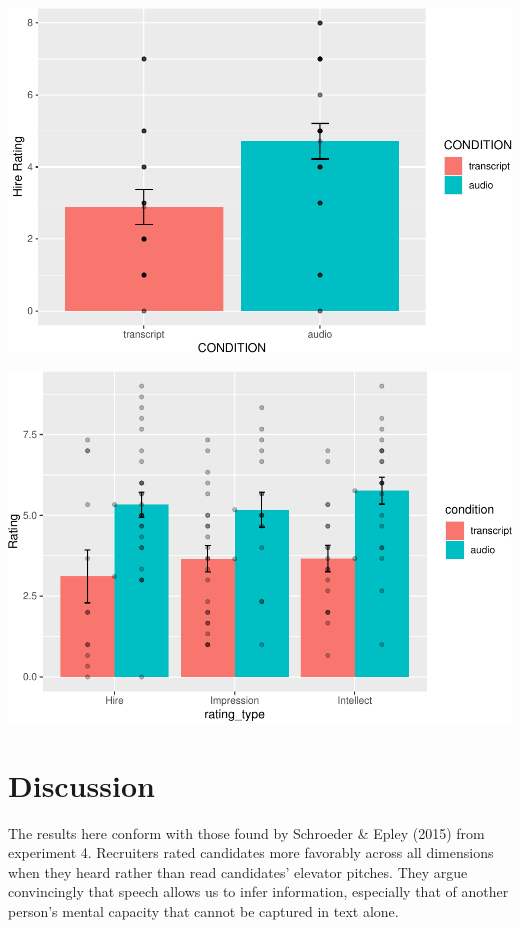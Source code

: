 \documentclass[
  english,
  man]{apa6}
\begin{document}
\includegraphics{CSF-semester-project_files/figure-latex/unnamed-chunk-4-1.pdf}

\includegraphics{CSF-semester-project_files/figure-latex/unnamed-chunk-5-1.pdf}

\hypertarget{discussion}{%
\section{Discussion}\label{discussion}}

The results here conform with those found by Schroeder \& Epley (2015) from experiment 4. Recruiters rated candidates more favorably across all dimensions when they heard rather than read candidates' elevator pitches. They argue convincingly that speech allows us to infer information, especially that of another person's mental capacity that cannot be captured in text alone.
\end{document}
